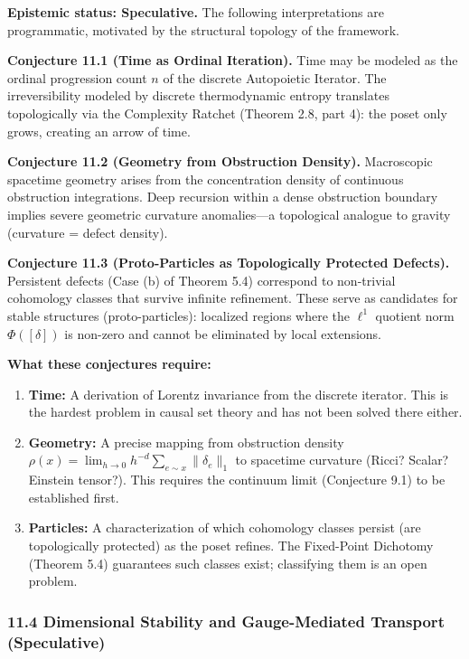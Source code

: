 \documentclass[
]{article}
\begin{document}
\textbf{Epistemic status: Speculative.} The following interpretations
are programmatic, motivated by the structural topology of the framework.

\textbf{Conjecture 11.1 (Time as Ordinal Iteration).} Time may be
modeled as the ordinal progression count \(n\) of the discrete
Autopoietic Iterator. The irreversibility modeled by discrete
thermodynamic entropy translates topologically via the Complexity
Ratchet (Theorem 2.8, part 4): the poset only grows, creating an arrow
of time.

\textbf{Conjecture 11.2 (Geometry from Obstruction Density).}
Macroscopic spacetime geometry arises from the concentration density of
continuous obstruction integrations. Deep recursion within a dense
obstruction boundary implies severe geometric curvature anomalies---a
topological analogue to gravity (curvature = defect density).

\textbf{Conjecture 11.3 (Proto-Particles as Topologically Protected
Defects).} Persistent defects (Case (b) of Theorem 5.4) correspond to
non-trivial cohomology classes that survive infinite refinement. These
serve as candidates for stable structures (proto-particles): localized
regions where the \(\ell^1\) quotient norm \(\Phi([\delta])\) is
non-zero and cannot be eliminated by local extensions.

\textbf{What these conjectures require:}

\begin{enumerate}
\def\labelenumi{\arabic{enumi}.}
\item
  \textbf{Time:} A derivation of Lorentz invariance from the discrete
  iterator. This is the hardest problem in causal set theory and has not
  been solved there either.
\item
  \textbf{Geometry:} A precise mapping from obstruction density
  \(\rho(x) = \lim_{h \to 0} h^{-d} \sum_{e \sim x} \|\delta_e\|_1\) to
  spacetime curvature (Ricci? Scalar? Einstein tensor?). This requires
  the continuum limit (Conjecture 9.1) to be established first.
\item
  \textbf{Particles:} A characterization of which cohomology classes
  persist (are topologically protected) as the poset refines. The
  Fixed-Point Dichotomy (Theorem 5.4) guarantees such classes exist;
  classifying them is an open problem.
\end{enumerate}

\subsubsection{11.4 Dimensional Stability and Gauge-Mediated Transport
(Speculative)}\label{dimensional-stability-and-gauge-mediated-transport-speculative}
\end{document}
